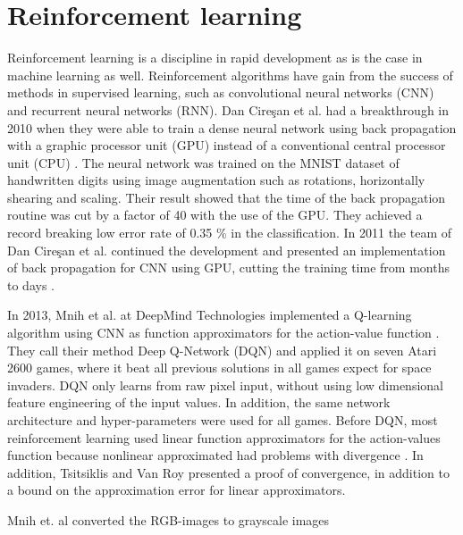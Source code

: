 \documentclass[class=book, crop=false]{standalone}
\begin{document}
\section{Reinforcement learning}
Reinforcement learning is a discipline in rapid development as is the case in machine learning as well. Reinforcement algorithms have gain from the success of methods in supervised learning, such as convolutional neural networks (CNN) and  recurrent neural networks (RNN). Dan Cire\c{s}an et al. had a breakthrough in 2010 when they were able to train a dense neural network using back propagation with a graphic processor unit (GPU) instead of a conventional central processor unit (CPU) \cite{DNN_gpu_2010}. The neural network was trained on the MNIST dataset of handwritten digits using image augmentation such as rotations, horizontally shearing and scaling. Their result showed that the time of the back propagation routine was cut by a factor of 40 with the use of the GPU. They achieved a record breaking low error rate of 0.35 \% in the classification. In 2011 the team of Dan Cire\c{s}an et al. continued the development and presented an implementation of back propagation for CNN using GPU, cutting the training time from months to days \cite{CNN_gpu_2011}.

In 2013, Mnih et al. at DeepMind Technologies implemented a Q-learning algorithm using CNN as function approximators for the action-value function \cite{DQN_Mnih_et_al_2013}. They call their method Deep Q-Network (DQN) and applied it on seven Atari 2600 games, where it beat all previous solutions in all games expect for space invaders. DQN only learns from raw pixel input, without using low dimensional feature engineering of the input values. In addition, the same network architecture and hyper-parameters were used for all games. Before DQN, most reinforcement learning used linear function approximators for the action-values function because nonlinear approximated had problems with divergence \cite{DQN_Mnih_et_al_2013}. In addition, Tsitsiklis and Van Roy presented a proof of convergence, in addition to a bound on the approximation error for linear approximators. 



Mnih et. al converted the RGB-images to grayscale images     
\end{document}
